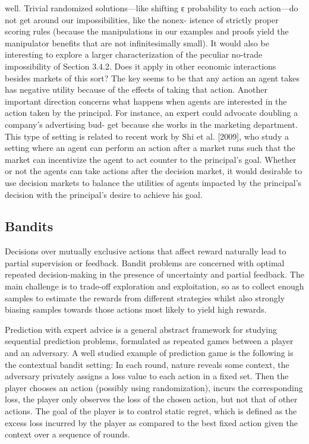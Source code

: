 {well. Trivial randomized solutions—like shifting ε probability to
each action—do not get around our impossibilities, like the nonex- istence of strictly proper scoring rules (because the manipulations
in our examples and proofs yield the manipulator benefits that are
not infinitesimally small).
It would also be interesting to explore a larger characterization of the peculiar no-trade impossibility of Section 3.4.2. Does it apply in other economic interactions besides markets of this sort? The key seems to be that any action an agent takes has negative utility because of the effects of taking that action.
Another important direction concerns what happens when agents are interested in the action taken by the principal. For instance, an expert could advocate doubling a company’s advertising bud- get because she works in the marketing department. This type of setting is related to recent work by Shi et al. [2009], who study a setting where an agent can perform an action after a market runs such that the market can incentivize the agent to act counter to the principal’s goal. Whether or not the agents can take actions after the decision market, it would desirable to use decision markets to balance the utilities of agents impacted by the principal’s decision with the principal’s desire to achieve his goal.}


\subsection{Bandits}

Decisions over mutually exclusive actions that affect reward naturally lead to partial supervision or feedback.
Bandit problems are concerned with optimal repeated decision-making in the presence of uncertainty and partial feedback. 
The main challenge is to trade-off exploration and exploitation, so as to collect enough samples to estimate the rewards from different strategies whilst also strongly biasing samples towards those actions most likely to yield high rewards.  

Prediction with expert advice is a general abstract framework for studying sequential prediction problems, formulated as repeated games between a player and an adversary.
A well studied example of prediction game is the following is the contextual bandit setting: In each round, nature reveals some context, the adversary privately assigns a loss value to each action in a fixed set.
Then the player chooses an action (possibly using randomization), incurs the corresponding loss, the player only observes the loss of the chosen action, but not that of other actions.
The goal of the player is to control static regret, which is defined as the excess loss incurred by the player as compared to the best fixed action given the context over a sequence of rounds.


